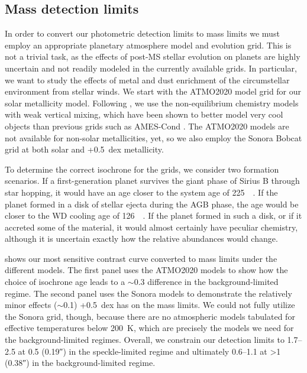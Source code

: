 \documentclass[twocolumn]{aastex631}
\begin{document}
\subsection{Mass detection limits}

In order to convert our photometric detection limits to mass limits we must employ an appropriate planetary atmosphere model and evolution grid. This is not a trivial task, as the effects of post-MS stellar evolution on planets are highly uncertain and not readily modeled in the currently available grids. In particular, we want to study the effects of metal and dust enrichment of the circumstellar environment from stellar winds. We start with the ATMO2020 model grid \citep{phillipsNewSetAtmosphere2020a} for our solar metallicity model. Following \citet{pathakHighContrastImaging2021}, we use the non-equilibrium chemistry models with weak vertical mixing, which have been shown to better model very cool objects than previous grids such as AMES-Cond \citep{allardModelsVerylowmassStars2012}. The ATMO2020 models are not available for non-solar metallicities, yet, so we also employ the Sonora Bobcat grid \citep{marleySonoraBobcatCloudfree2021,marleySonoraBrownDwarf2021} at both solar and +\qty{0.5}{dex} metallicity.

To determine the correct isochrone for the grids, we consider two formation scenarios. If a first-generation planet survives the giant phase of Sirius B through star hopping, it would have an age closer to the system age of \qty{225}{\mega\year}. If the planet formed in a disk of stellar ejecta during the AGB phase, the age would be closer to the WD cooling age of \qty{126}{\mega\year}. If the planet formed in such a disk, or if it accreted some of the material, it would almost certainly have peculiar chemistry, although it is uncertain exactly how the relative abundances would change. 

 shows our most sensitive contrast curve converted to mass limits under the different models. The first panel uses the ATMO2020 models to show how the choice of isochrone age leads to a $\sim$\qty{0.3}{\jupitermass} difference in the background-limited regime. The second panel uses the Sonora models to demonstrate the relatively minor effects ($\sim$\qty{0.1}{\jupitermass}) +\qty{0.5}{dex} has on the mass limits. We could not fully utilize the Sonora grid, though, because there are no atmospheric models tabulated for effective temperatures below \qty{200}{\kelvin}, which are precisely the models we need for the background-limited regimes. Overall, we constrain our detection limits to \qtyrange{1.7}{2.5}{\jupitermass} at \qty{0.5}{\au} (\ang{;;0.19}) in the speckle-limited regime and ultimately \qtyrange{0.6}{1.1}{\jupitermass} at \textgreater\qty{1}{\au} (\ang{;;0.38}) in the background-limited regime.
\end{document}
